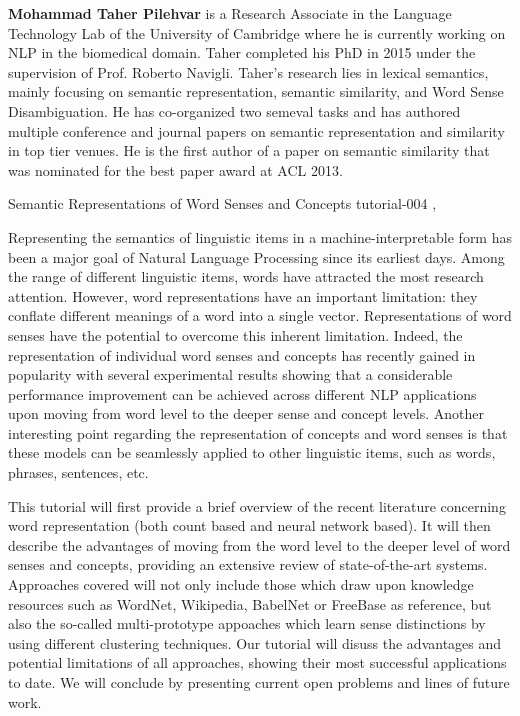\begin{bio}
{\bfseries Mohammad Taher Pilehvar} is a Research Associate in the Language Technology Lab of the University of Cambridge where he is currently working on NLP in the biomedical domain. Taher completed his PhD in 2015 under the supervision of Prof. Roberto Navigli. Taher's research lies in lexical semantics, mainly focusing on semantic representation, semantic similarity, and Word Sense Disambiguation. He has co-organized two semeval tasks and has authored multiple conference and journal papers on semantic representation and similarity in top tier venues. He is the first author of a paper on semantic similarity that was nominated for the best paper award at ACL 2013.
\end{bio}

\begin{tutorial}
  {Semantic Representations of Word Senses and Concepts}
    {tutorial-004}
      {\daydateyear, \tutorialmorningtime}
        {\TutLocD}
        
        Representing the semantics of linguistic items in a machine-interpretable form has been a major goal of Natural Language Processing since its earliest days. Among the range of different linguistic items, words have attracted the most research attention. However, word representations have an important limitation: they conflate different meanings of a word into a single vector. Representations of word senses have the potential to overcome this inherent limitation. Indeed, the representation of individual word senses and concepts has recently gained in popularity with several experimental results showing that a considerable performance improvement can be achieved across different NLP applications upon moving from word level to the deeper sense and concept levels. Another interesting point regarding the representation of concepts and word senses is that these models can be seamlessly applied to other linguistic items, such as words, phrases, sentences, etc.
        
        This tutorial will first provide a brief overview of the recent literature concerning word representation (both count based and neural network based). It will then describe the advantages of moving from the word level to the deeper level of word senses and concepts, providing an extensive review of state-of-the-art systems. Approaches covered will not only include those which draw upon knowledge resources such as WordNet, Wikipedia, BabelNet or FreeBase as reference, but also the so-called multi-prototype appoaches which learn sense distinctions by using different clustering techniques. Our tutorial will disuss the advantages and potential limitations of all approaches, showing their most successful applications to date. We will conclude by presenting current open problems and lines of future work.
        \end{tutorial}
        
